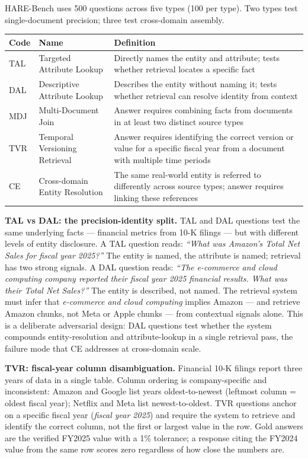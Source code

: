 \documentclass[
]{article}
\begin{document}
HARE-Bench uses 500 questions across five types (100 per type). Two
types test single-document precision; three test cross-domain assembly.

\begin{small}
\setlength{\tabcolsep}{4pt}
\begin{longtable}{p{0.5in}p{1.2in}p{4.5in}}
\toprule
\textbf{Code} & \textbf{Name} & \textbf{Definition} \\
\midrule
\endhead
TAL & Targeted Attribute Lookup & Directly names the entity and attribute; tests whether retrieval locates a specific fact \\
DAL & Descriptive Attribute Lookup & Describes the entity without naming it; tests whether retrieval can resolve identity from context \\
MDJ & Multi-Document Join & Answer requires combining facts from documents in at least two distinct source types \\
TVR & Temporal Versioning Retrieval & Answer requires identifying the correct version or value for a specific fiscal year from a document with multiple time periods \\
CE & Cross-domain Entity Resolution & The same real-world entity is referred to differently across source types; answer requires linking these references \\
\bottomrule
\end{longtable}
\end{small}

\textbf{TAL vs DAL: the precision-identity split.} TAL and DAL questions
test the same underlying facts --- financial metrics from 10-K filings
--- but with different levels of entity disclosure. A TAL question
reads: \emph{``What was Amazon's Total Net Sales for fiscal year
2025?''} The entity is named, the attribute is named; retrieval has two
strong signals. A DAL question reads: \emph{``The e-commerce and cloud
computing company reported their fiscal year 2025 financial results.
What was their Total Net Sales?''} The entity is described, not named.
The retrieval system must infer that \emph{e-commerce and cloud
computing} implies Amazon --- and retrieve Amazon chunks, not Meta or
Apple chunks --- from contextual signals alone. This is a deliberate
adversarial design: DAL questions test whether the system compounds
entity-resolution and attribute-lookup in a single retrieval pass, the
failure mode that CE addresses at cross-domain scale.

\textbf{TVR: fiscal-year column disambiguation.} Financial 10-K filings
report three years of data in a single table. Column ordering is
company-specific and inconsistent: Amazon and Google list years
oldest-to-newest (leftmost column = oldest fiscal year); Netflix and
Meta list newest-to-oldest. TVR questions anchor on a specific fiscal
year (\emph{fiscal year 2025}) and require the system to retrieve and
identify the correct column, not the first or largest value in the row.
Gold answers are the verified FY2025 value with a 1\% tolerance; a
response citing the FY2024 value from the same row scores zero
regardless of how close the numbers are.
\end{document}
